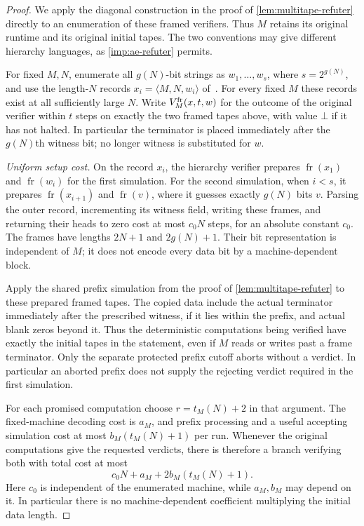 \documentclass[11pt,letterpaper]{article}
\theoremstyle{definition}
\theoremstyle{remark}
\begin{document}
\begin{proof}
We apply the diagonal construction in the proof of
\cref{lem:multitape-refuter} directly to an enumeration of these
framed verifiers. Thus \(M\) retains its original runtime and its
original initial tapes. The two conventions may give different
hierarchy languages, as \cref{imp:ae-refuter} permits.

For fixed \(M,N\), enumerate all \(g(N)\)-bit strings as
\(w_1,\ldots,w_s\), where \(s=2^{g(N)}\), and use the length-\(N\)
records \(x_i=\langle M,N,w_i\rangle\) of~\cite[Section~4.1]{CLW20}.
For every fixed \(M\) these records exist at all sufficiently large
\(N\). Write \(V_M^{\rm fr}(x,t,w)\) for the outcome of the original
verifier within \(t\) steps on exactly the two framed tapes above,
with value \(\bot\) if it has not halted. In particular the terminator
is placed immediately after the \(g(N)\)th witness bit; no longer
witness is substituted for \(w\).

\emph{Uniform setup cost.} On the record \(x_i\), the hierarchy
verifier prepares \(\operatorname{fr}(x_1)\) and
\(\operatorname{fr}(w_i)\) for the first simulation. For the second
simulation, when \(i<s\), it prepares \(\operatorname{fr}(x_{i+1})\)
and \(\operatorname{fr}(v)\), where it guesses exactly \(g(N)\) bits
\(v\). Parsing the outer record, incrementing its witness field,
writing these frames, and returning their heads to zero cost at most
\(c_0N\) steps, for an absolute constant \(c_0\). The frames have
lengths \(2N+1\) and \(2g(N)+1\). Their bit representation is
independent of \(M\); it does not encode every data bit by a
machine-dependent block.

Apply the shared prefix simulation from the proof of
\cref{lem:multitape-refuter} to these prepared framed tapes. The
copied data include the actual terminator immediately after the
prescribed witness, if it lies within the prefix, and actual blank
zeros beyond it. Thus the deterministic computations being verified
have exactly the initial tapes in the statement, even if \(M\)
reads or writes past a frame terminator. Only the separate protected
prefix cutoff aborts without a verdict. In particular an aborted
prefix does not supply the rejecting verdict required in the first
simulation.

For each promised computation choose \(r=t_M(N)+2\) in that argument.
The fixed-machine decoding cost is \(a_M\), and prefix processing
and a useful accepting simulation cost at most
\(b_M(t_M(N)+1)\) per run. Whenever the original computations give
the requested verdicts, there is therefore a branch verifying both
with total cost at most
\[
 c_0N+a_M+2b_M(t_M(N)+1).
\]
Here \(c_0\) is independent of the enumerated machine, while
\(a_M,b_M\) may depend on it. In particular there is no
machine-dependent coefficient multiplying the initial data length.


\end{proof}
\end{document}
